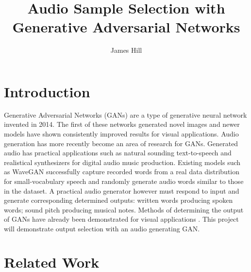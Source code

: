 \documentclass[a4paper, dvipsnames, titlepage]{article}
\title{Audio Sample Selection with Generative Adversarial Networks}
\author{James Hill}
\date{}
\begin{document}
\maketitle
\tableofcontents

\newpage

\section{Introduction}

Generative Adversarial Networks (GANs) \citep{2014arXiv1406.2661G} are a type of generative neural network invented in 2014.
The first of these networks generated novel images and newer models have shown consistently improved results for visual applications.
\newline
\newline
Audio generation has more recently become an area of research for GANs.
Generated audio has practical applications such as natural sounding text-to-speech and realistical synthesizers for digital audio music production.
Existing models such as WaveGAN \citep{2018arXiv180204208D} successfully capture recorded words from a real data distribution for small-vocabulary speech and randomly generate audio words similar to those in the dataset.
\newline
\newline
A practical audio generator however must respond to input and generate corresponding determined outputs: written words producing spoken words; sound pitch producing musical notes.
Methods of determining the output of GANs have already been demonstrated for visual applications \citep{2014arXiv1411.1784M}.
This project will demonstrate output selection with an audio generating GAN.

\newpage

\section{Related Work}
\end{document}
